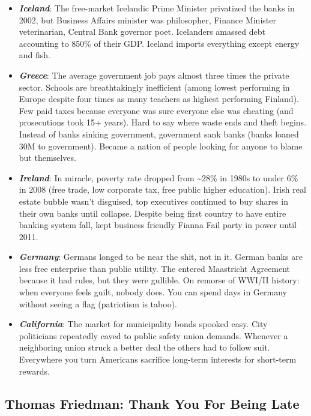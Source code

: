 \documentclass[
]{article}
\begin{document}
\begin{itemize}
\item
  \textbf{\emph{Iceland}}: The free-market Icelandic Prime Minister
  privatized the banks in 2002, but Business Affairs minister was
  philosopher, Finance Minister veterinarian, Central Bank governor
  poet. Icelanders amassed debt accounting to 850\% of their GDP.
  Iceland imports everything except energy and fish.
\item
  \textbf{\emph{Greece}}: The average government job pays almost three
  times the private sector. Schools are breathtakingly inefficient
  (among lowest performing in Europe despite four times as many teachers
  as highest performing Finland). Few paid taxes because everyone was
  sure everyone else was cheating (and prosecutions took 15+ years).
  Hard to say where waste ends and theft begins. Instead of banks
  sinking government, government sank banks (banks loaned 30M to
  government). Became a nation of people looking for anyone to blame but
  themselves.
\item
  \textbf{\emph{Ireland}}: In miracle, poverty rate dropped from
  \textasciitilde28\% in 1980s to under 6\% in 2008 (free trade, low
  corporate tax, free public higher education). Irish real estate bubble
  wasn't disguised, top executives continued to buy shares in their own
  banks until collapse. Despite being first country to have entire
  banking system fall, kept business friendly Fianna Fail party in power
  until 2011.
\item
  \textbf{\emph{Germany}}: Germans longed to be near the shit, not in
  it. German banks are less free enterprise than public utility. The
  entered Maastricht Agreement because it had rules, but they were
  gullible. On remorse of WWI/II history: when everyone feels guilt,
  nobody does. You can spend days in Germany without seeing a flag
  (patriotism is taboo).
\item
  \textbf{\emph{California}}: The market for municipality bonds spooked
  easy. City politicians repeatedly caved to public safety union
  demands. Whenever a neighboring union struck a better deal the others
  had to follow suit. Everywhere you turn Americans sacrifice long-term
  interests for short-term rewards.
\end{itemize}

\hypertarget{thomas-friedman-thank-you-for-being-late}{%
\subsection{Thomas Friedman: Thank You For Being
Late}\label{thomas-friedman-thank-you-for-being-late}}
\end{document}
